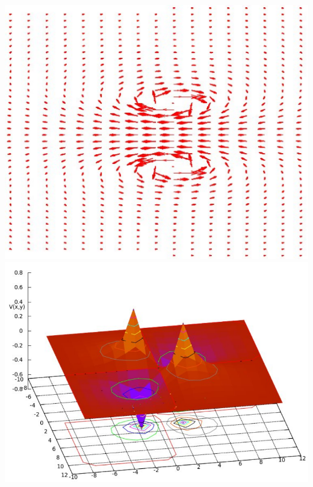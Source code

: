 \documentclass[../r.tex]{subfiles}
\begin{document}
\noindent
\includegraphics[scale=0.3]{../scientific/magnetic_field.png} 
\includegraphics[scale=0.2]{../scientific/poisson2.png} 
\end{document}
